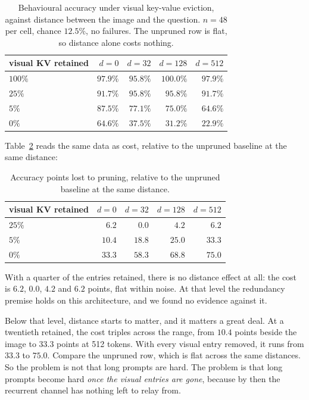 \documentclass[10pt]{article}
\begin{document}
\begin{table}[h]
\centering\small
\begin{tabular}{lrrrr}
\toprule
visual KV retained & $d{=}0$ & $d{=}32$ & $d{=}128$ & $d{=}512$ \\
\midrule
$100\%$ & $97.9\%$ & $95.8\%$ & $100.0\%$ & $97.9\%$ \\
$25\%$  & $91.7\%$ & $95.8\%$ & $95.8\%$  & $91.7\%$ \\
$5\%$   & $87.5\%$ & $77.1\%$ & $75.0\%$  & $64.6\%$ \\
$0\%$   & $64.6\%$ & $37.5\%$ & $31.2\%$  & $22.9\%$ \\
\bottomrule
\end{tabular}
\caption{Behavioural accuracy under visual key-value eviction, against distance
between the image and the question. $n = 48$ per cell, chance $12.5\%$, no
failures. The unpruned row is flat, so distance alone costs nothing.}
\label{tab:eviction}
\end{table}

Table~\ref{tab:eviction_cost} reads the same data as cost, relative to the
unpruned baseline at the same distance:

\begin{table}[h]
\centering\small
\begin{tabular}{lrrrr}
\toprule
visual KV retained & $d{=}0$ & $d{=}32$ & $d{=}128$ & $d{=}512$ \\
\midrule
$25\%$ & $6.2$  & $0.0$  & $4.2$  & $6.2$ \\
$5\%$  & $10.4$ & $18.8$ & $25.0$ & $33.3$ \\
$0\%$  & $33.3$ & $58.3$ & $68.8$ & $75.0$ \\
\bottomrule
\end{tabular}
\caption{Accuracy points lost to pruning, relative to the unpruned baseline at
the same distance.}
\label{tab:eviction_cost}
\end{table}

With a quarter of the entries retained, there is no distance effect at all:
the cost is $6.2$, $0.0$, $4.2$ and $6.2$ points, flat within noise. At that
level the redundancy premise holds on this architecture, and we found no
evidence against it.

Below that level, distance starts to matter, and it matters a great deal. At a
twentieth retained, the cost triples across the range, from $10.4$ points
beside the image to $33.3$ points at 512 tokens. With every visual entry
removed, it runs from $33.3$ to $75.0$. Compare the unpruned row, which is
flat across the same distances. So the problem is not that long prompts are
hard. The problem is that long prompts become hard \emph{once the visual
entries are gone}, because by then the recurrent channel has nothing left to
relay from.
\end{document}
